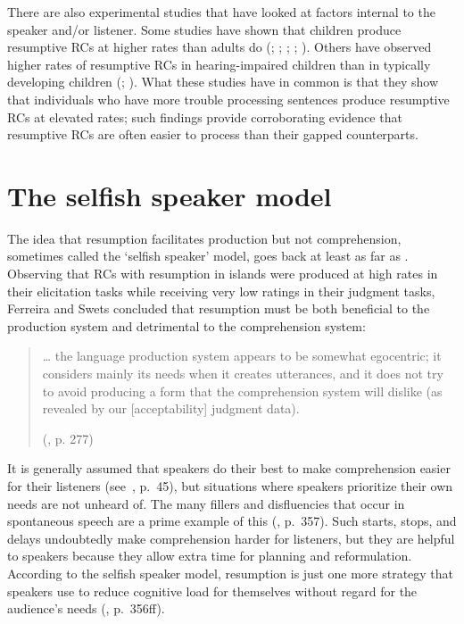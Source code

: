 There are also experimental studies that have looked at factors internal to the speaker and/or listener. Some studies have shown that children produce resumptive RCs at higher rates than adults do (\cite{kim2013}; \cite{labelle1990}; \cite{mckee.mcdaniel2001}; \cite{perez-leroux1995}; \cite{varlokosta.armon-lotem1998}). Others have observed higher rates of resumptive RCs in hearing-impaired children than in typically developing children (\cite{friedmann.costa2011}; \cite{friedmann.etal2008}). What these studies have in common is that they show that individuals who have more trouble processing sentences produce resumptive RCs at elevated rates; such findings provide corroborating evidence that resumptive RCs are often easier to process than their gapped counterparts.

\section{The selfish speaker model}\label{res-selfish}

The idea that resumption facilitates production but not comprehension, sometimes called the `selfish speaker' model, goes back at least as far as \textcite{ferreira.swets2005}. Observing that RCs with resumption in islands were produced at high rates in their elicitation tasks while receiving very low ratings in their judgment tasks, Ferreira and Swets concluded that resumption must be both beneficial to the production system and detrimental to the comprehension system:

\begin{samepage}\begin{quote}
\dots{} the language production system appears to be somewhat egocentric; it considers mainly its needs when it creates utterances, and it does not try to avoid producing a form that the comprehension system will dislike (as revealed by our [acceptability] judgment data).\par\vspace{5pt}
\hfill (\cite{ferreira.swets2005}, p. 277)
\end{quote}\end{samepage}
\vspace{-12pt}

It is generally assumed that speakers do their best to make comprehension easier for their listeners (see~\cite{grice1975}, p.~45), but situations where speakers prioritize their own needs are not unheard of. The many fillers and disfluencies that occur in spontaneous speech are a prime example of this (\cite{polinsky.etal2013}, p.~357). Such starts, stops, and delays undoubtedly make comprehension harder for listeners, but they are helpful to speakers because they allow extra time for planning and reformulation. According to the selfish speaker model, resumption is just one more strategy that speakers use to reduce cognitive load for themselves without regard for the audience's needs (\cite{polinsky.etal2013}, p.~356ff). 


